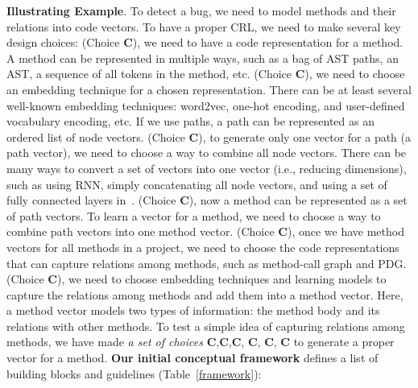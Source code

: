 \textbf{Illustrating Example}. To detect a bug, we need to model
methods and their relations into code vectors.  To have a proper CRL,
we need to make several key design choices: (Choice
\textbf{C}), we need to have a code representation for a
method. A method can be represented in multiple ways, such as a bag of
AST paths, an AST, a sequence of all tokens in the method,
etc. (Choice \textbf{C}), we need to choose an embedding
technique for a chosen representation.  There can be at least several
well-known embedding techniques: word2vec, one-hot encoding, and
user-defined vocabulary encoding, etc.
If we use paths, a path can be represented as an ordered list of node
vectors.  (Choice \textbf{C}), to generate only one vector
for a path (a path vector), we need to choose a way to combine all
node vectors.  There can be many ways to convert a set of vectors into
one vector (i.e., reducing dimensions), such as using RNN, simply
concatenating all node vectors, and using a set of fully connected
layers in~\cnn.  (Choice \textbf{C}), now a method can be
represented as a set of path vectors. To learn a vector for a method,
we need to choose a way to combine path vectors into one method
vector.  (Choice \textbf{C}), once we have method vectors
for all methods in a project, we need to choose the code
representations that can capture relations among methods, such as
method-call graph and PDG.  (Choice \textbf{C}), we need to
choose embedding techniques and learning models to capture the
relations among methods and add them into a method vector. Here, a
method vector models two types of information: the method body and its
relations with other methods. To test a simple idea of capturing
relations among methods, we have made \textit{a set of choices}
{\textbf{C},\textbf{C},\textbf{C},
  \textbf{C}, \textbf{C}, \textbf{C}}
to generate a proper vector for a method. \textbf{Our initial
  conceptual framework} defines a list of building blocks and
guidelines (Table~\ref{framework}):



